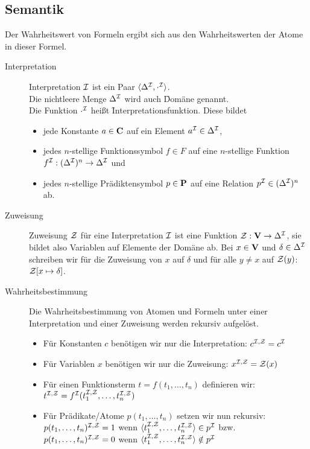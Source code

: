 \subsection{Semantik}
    Der Wahrheitswert von Formeln ergibt sich aus den Wahrheitswerten der Atome in dieser Formel. 
    \begin{description}
        \item[Interpretation] Interpretation $\mathcal{I}$  ist ein Paar $\langle\Delta^{\mathcal{I}}, \cdot^{\mathcal{I}}\rangle$.\\
            Die nichtleere Menge $\Delta^{\mathcal{I}}$ wird auch \f{Domäne} genannt. \\
            Die Funktion $\cdot^{\mathcal{I}}$ heißt \f{Interpretationsfunktion}. Diese bildet
            \begin{itemize}
                \item jede Konstante $a \in \textbf{C}$ auf ein Element $a^{\mathcal{I}} \in \Delta^{\mathcal{I}}$,
                \item jedes $n$-stellige Funktionssymbol $f \in F$ auf eine $n$-stellige Funktion $f^{\mathcal{I}}: (\Delta^{\mathcal{I}})^{n} \to \Delta^{\mathcal{I}}$ und
                \item jedes $n$-stellige Prädiktensymbol $p \in \textbf{P}$ auf eine Relation $p^{\mathcal{I}} \in (\Delta^{\mathcal{I}})^{n}$ ab.
            \end{itemize}

        \item[Zuweisung] Zuweisung $\mathcal{Z}$ für eine Interpretation $\mathcal{I}$ ist eine Funktion $\mathcal{Z}: \textbf{V} \to \Delta^{\mathcal{I}}$, sie bildet also Variablen auf Elemente der Domäne ab.
            Bei $x \in \textbf{V}$ und $\delta \in \Delta^{\mathcal{I}}$ schreiben wir für die Zuweisung von $x$ auf $\delta$ und für alle $y \neq x$ auf $\mathcal{Z} (y)$: $\mathcal{Z}[x \mapsto \delta]$.{}

        \item[Wahrheitsbestimmung] Die Wahrheitsbestimmung von Atomen und Formeln unter einer Interpretation und einer Zuweisung werden rekursiv aufgelöst.
            \begin{itemize}
                \item Für Konstanten $c$ benötigen wir nur die Interpretation: $c^{\mathcal{I},\mathcal{Z}} = c^{\mathcal{I}}$
                \item Für Variablen $x$ benötigen wir nur die Zuweisung: $x^{\mathcal{I},\mathcal{Z}} = \mathcal{Z}(x)$
                \item Für einen Funktionsterm $t = f(t_{1},\dots,t_{n})$ definieren wir: $t^{\mathcal{I}, \mathcal{Z}} = f^{\mathcal{I}}(t_{1}^{\mathcal{I}, \mathcal{Z}}, \dots, t_{n}^{\mathcal{I}, \mathcal{Z}})$
                \item Für Prädikate/Atome $p(t_{1},\dots,t_{n})$ setzen wir nun rekursiv: \\
                    $p(t_{1},\dots,t_{n})^{\mathcal{I},\mathcal{Z}} = 1$ wenn $\langle t_{1}^{\mathcal{I},\mathcal{Z}},\dots,t_{n}^{\mathcal{I},\mathcal{Z}} \rangle \in p^{\mathcal{I}}$ bzw. \\
                    $p(t_{1},\dots,t_{n})^{\mathcal{I},\mathcal{Z}} = 0$ wenn $\langle t_{1}^{\mathcal{I},\mathcal{Z}},\dots,t_{n}^{\mathcal{I},\mathcal{Z}} \rangle \notin p^{\mathcal{I}}$
            \end{itemize}


\end{description}
